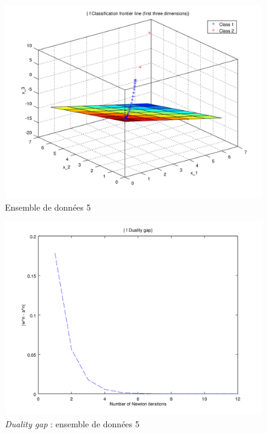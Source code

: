 \documentclass{article}
\begin{document}
         \begin{figure}[H]
           \begin{center}
             \includegraphics[scale=0.5]{images/plane5.png}
             \caption{Ensemble de données 5}
           \end{center}
         \end{figure}

         \begin{figure}[H]
           \begin{center}
             \includegraphics[scale=0.5]{images/duality5.png}
             \caption{\emph{Duality gap} : ensemble de données 5}
           \end{center}
         \end{figure}
\end{document}
